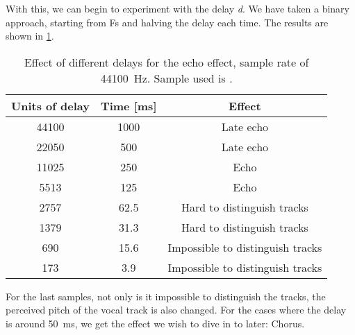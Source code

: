 With this, we can begin to experiment with the delay \emph{d}. We have taken a binary approach, starting from Fs and halving the delay each time. The results are shown in \cref{tbl:echo}.
\begin{table}[!hbt]
\centering
\begin{tabular}{ccc}
	\toprule
	Units of delay & Time [ms] & Effect \\ 
	\midrule
	44100 & 1000 & Late echo \\ 
	22050 & 500 & Late echo \\ 
	11025 & 250 & Echo \\ 
	5513 & 125 & Echo \\ 
	2757 & 62.5 & Hard to distinguish tracks \\ 
	1379 & 31.3 & Hard to distinguish tracks \\ 
	690 & 15.6 & Impossible to distinguish tracks \\ 
	173 & 3.9 & Impossible to distinguish tracks \\ 
	\bottomrule
\end{tabular}
\caption{Effect of different delays for the echo effect, sample rate of \SI{44100}{\hertz}. Sample used is \cite{audiohello}.}
\label{tbl:echo}
\end{table}
For the last samples, not only is it impossible to distinguish the tracks, the perceived pitch of the vocal track is also changed. For the cases where the delay is around \SI{50}{\milli\second}, we get the effect we wish to dive in to later: Chorus.
